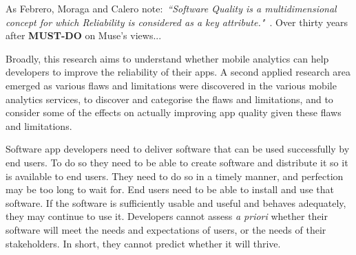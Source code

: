 As Febrero, Moraga and Calero note:~\emph{``Software Quality is a multidimensional concept for which Reliability is considered as a key attribute."}~\citep[p.224]{febrero2017_software_reliability_as_user_perception}.
Over thirty years after \textbf{MUST-DO} on Muse's views...


Broadly, this research aims to understand whether mobile analytics can help developers to improve the reliability of their apps. A second applied research area emerged as various flaws and limitations were discovered in the various mobile analytics services, to discover and categorise the flaws and limitations, and to consider some of the effects on actually improving app quality given these flaws and limitations. 

Software app developers need to deliver software that can be used successfully by end users. To do so they need to be able to create software and distribute it so it is available to end users. They need to do so in a timely manner, and perfection may be too long to wait for. End users need to be able to install and use that software. If the software is sufficiently usable and useful and behaves adequately, they may continue to use it. Developers cannot assess \emph{a priori} whether their software will meet the needs and expectations of users, or the needs of their stakeholders. 
In short, they cannot predict whether it will thrive.

